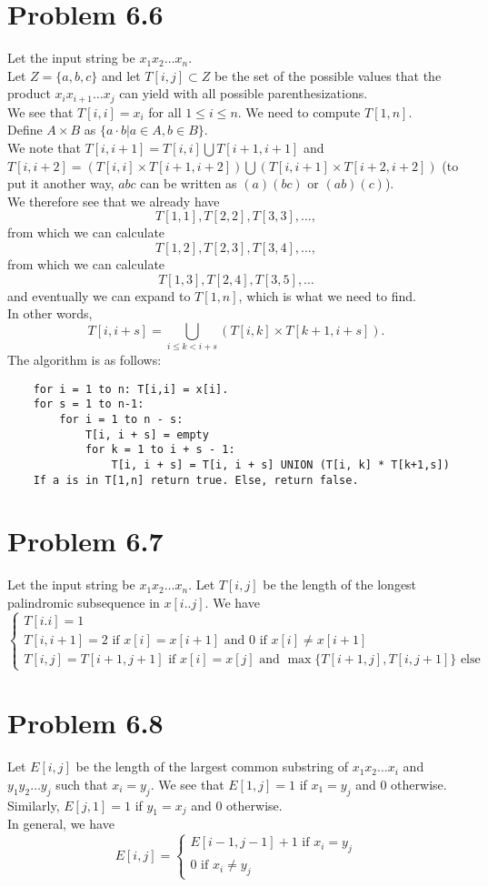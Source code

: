 \documentclass[12pt]{article}
\begin{document}
\section{Problem 6.6}
Let the input string be $x_1 x_2 \ldots x_n$. \\
Let $Z = \{a,b,c\}$ and let $T[i,j] \subset Z$ be the set of the possible values that the product $x_i x_{i+1} \ldots x_{j}$ can yield with all possible parenthesizations. \\
We see that $T[i,i] = x_i$ for all $1 \le i \le n$. We need to compute $T[1,n]$. \\
Define $A \times B$ as $\{ a \cdot b | a \in A, b \in B\}$. \\
We note that $T[i, i+1] = T[i,i] \bigcup T[i+1, i+1]$ and $T[i,i+2] = (T[i,i] \times T[i+1, i+2]) \bigcup (T[i,i+1] \times T[i+2,i+2])$ (to put it another way, $abc$ can be written as $(a)(bc)$ or $(ab)(c)$). \\
We therefore see that we already have $$T[1,1], T[2,2], T[3,3], \ldots,$$
from which we can calculate $$T[1,2], T[2,3], T[3,4], \ldots,$$
from which we can calculate $$T[1,3], T[2,4], T[3,5], \ldots $$
and eventually we can expand to $T[1,n]$, which is what we need to find.\\
In other words, $$T[i, i + s] = \bigcup_{i \le k < i + s} (T[i,k] \times T[k+1, i + s]).$$
The algorithm is as follows:
\begin{lstlisting}
	for i = 1 to n: T[i,i] = x[i].
	for s = 1 to n-1:
		for i = 1 to n - s:
			T[i, i + s] = empty
			for k = 1 to i + s - 1:
				T[i, i + s] = T[i, i + s] UNION (T[i, k] * T[k+1,s])
	If a is in T[1,n] return true. Else, return false.
\end{lstlisting}

\section{Problem 6.7}
Let the input string be $x_1 x_2 \ldots x_n$. Let $T[i,j]$ be the length of the longest palindromic subsequence in $x[i..j]$. We have $$\begin{cases} T[i.i] = 1 \\ T[i,i+1] = 2 \text{ if } x[i] = x[i+1] \text{ and } 0 \text{ if } x[i] \ne x[i+1] \\ T[i,j] = T[i+1,j+1] \text{ if } x[i] = x[j] \text{ and } \max \{T[i+1,j], T[i,j+1]\} \text{ else} \end{cases}$$

\section{Problem 6.8}
Let $E[i,j]$ be the length of the largest common substring of $x_1 x_2 \ldots x_i$ and $y_1 y_2 \ldots y_j$ such that $x_i = y_j$. We see that $E[1,j] = 1$ if $x_1 = y_j$ and $0$ otherwise. Similarly, $E[j,1] = 1$ if $y_1 = x_j$ and $0$ otherwise.\\
In general, we have $$E[i,j] = \begin{cases} E[i-1,j-1] + 1 \text{ if } x_i = y_j \\ 0 \text{ if } x_i \ne y_j \end{cases}$$
\end{document}
